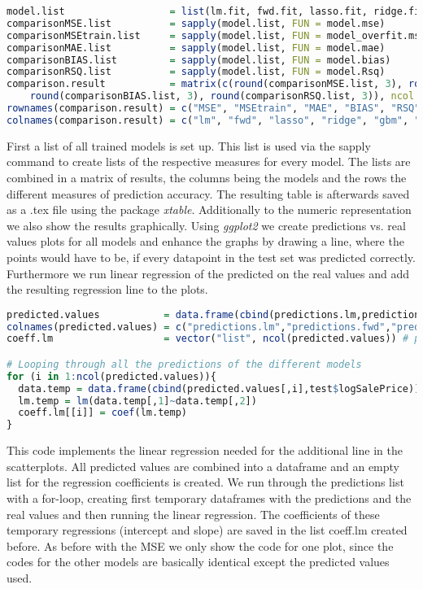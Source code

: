 \begin{lstlisting}[language=R]
model.list                  = list(lm.fit, fwd.fit, lasso.fit, ridge.fit, gbmtuned, rftuned)
comparisonMSE.list          = sapply(model.list, FUN = model.mse)
comparisonMSEtrain.list     = sapply(model.list, FUN = model_overfit.mse)
comparisonMAE.list          = sapply(model.list, FUN = model.mae)
comparisonBIAS.list         = sapply(model.list, FUN = model.bias)
comparisonRSQ.list          = sapply(model.list, FUN = model.Rsq)
comparison.result           = matrix(c(round(comparisonMSE.list, 3), round(comparisonMSEtrain.list, 3), round(comparisonMAE.list, 3), 
    round(comparisonBIAS.list, 3), round(comparisonRSQ.list, 3)), ncol = length(model.list), byrow = TRUE)
rownames(comparison.result) = c("MSE", "MSEtrain", "MAE", "BIAS", "RSQ")
colnames(comparison.result) = c("lm", "fwd", "lasso", "ridge", "gbm", "rf")
\end{lstlisting}
First a list of all trained models is set up. This list is used via the sapply command to create lists of the respective measures for every model. The lists are combined in a matrix of results, the columns being the models and the rows the different measures of prediction accuracy. The resulting table is afterwards saved as a .tex file using the package \textit{xtable}. Additionally to the numeric representation we also show the results graphically. Using \textit{ggplot2} we create predictions vs. real values plots for all models and enhance the graphs by drawing a line, where the points would have to be, if every datapoint in the test set was predicted correctly. Furthermore we run linear regression of the predicted on the real values and add the resulting regression line to the plots. 
\begin{lstlisting}[language=R]
predicted.values           = data.frame(cbind(predictions.lm,predictions.fwd,predictions.lasso,predictions.ridge,predictions.rf,predictions.gbm))
colnames(predicted.values) = c("predictions.lm","predictions.fwd","predictions.lasso","predictions.ridge","predictions.rf","predictions.gbm")
coeff.lm                   = vector("list", ncol(predicted.values)) # preparing an empty list for coefficients of regression

# Looping through all the predictions of the different models
for (i in 1:ncol(predicted.values)){
  data.temp = data.frame(cbind(predicted.values[,i],test$logSalePrice))
  lm.temp = lm(data.temp[,1]~data.temp[,2])
  coeff.lm[[i]] = coef(lm.temp)
}
\end{lstlisting}
This code implements the linear regression needed for the additional line in the scatterplots. All predicted values are combined into a dataframe and an empty list for the regression coefficients is created. We run through the predictions list with a for-loop, creating first temporary dataframes with the predictions and the real values and then running the linear regression. The coefficients of these temporary regressions (intercept and slope) are saved in the list coeff.lm created before. As before with the MSE we only show the code for one plot, since  the codes for the other models are basically identical except the predicted values used.
